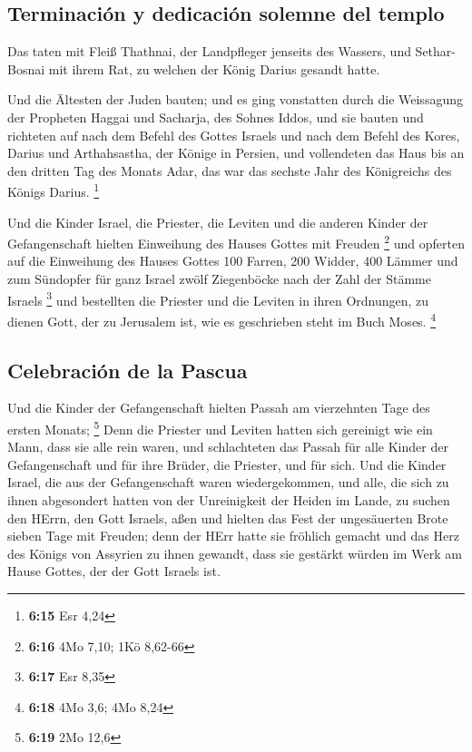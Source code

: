 \hypertarget{terminaciuxf3n-y-dedicaciuxf3n-solemne-del-templo}{%
\subsection{Terminación y dedicación solemne del
templo}\label{terminaciuxf3n-y-dedicaciuxf3n-solemne-del-templo}}

 Das taten mit Fleiß Thathnai, der Landpfleger jenseits
des Wassers, und Sethar-Bosnai mit ihrem Rat, zu welchen der König
Darius gesandt hatte.

 Und die Ältesten der Juden bauten; und es ging
vonstatten durch die Weissagung der Propheten Haggai und Sacharja, des
Sohnes Iddos, und sie bauten und richteten auf nach dem Befehl des
Gottes Israels und nach dem Befehl des Kores, Darius und Arthahsastha,
der Könige in Persien,  und vollendeten das Haus bis an
den dritten Tag des Monats Adar, das war das sechste Jahr des
Königreichs des Königs Darius. \footnote{\textbf{6:15} Esr 4,24}

 Und die Kinder Israel, die Priester, die Leviten und die
anderen Kinder der Gefangenschaft hielten Einweihung des Hauses Gottes
mit Freuden \footnote{\textbf{6:16} 4Mo 7,10; 1Kö 8,62-66}
 und opferten auf die Einweihung des Hauses Gottes 100
Farren, 200 Widder, 400 Lämmer und zum Sündopfer für ganz Israel zwölf
Ziegenböcke nach der Zahl der Stämme Israels \footnote{\textbf{6:17} Esr
  8,35}  und bestellten die Priester und die Leviten in
ihren Ordnungen, zu dienen Gott, der zu Jerusalem ist, wie es
geschrieben steht im Buch Moses. \footnote{\textbf{6:18} 4Mo 3,6; 4Mo
  8,24}

\hypertarget{celebraciuxf3n-de-la-pascua}{%
\subsection{Celebración de la
Pascua}\label{celebraciuxf3n-de-la-pascua}}

 Und die Kinder der Gefangenschaft hielten Passah am
vierzehnten Tage des ersten Monats; \footnote{\textbf{6:19} 2Mo 12,6}
 Denn die Priester und Leviten hatten sich gereinigt wie
ein Mann, dass sie alle rein waren, und schlachteten das Passah für alle
Kinder der Gefangenschaft und für ihre Brüder, die Priester, und für
sich.  Und die Kinder Israel, die aus der Gefangenschaft
waren wiedergekommen, und alle, die sich zu ihnen abgesondert hatten von
der Unreinigkeit der Heiden im Lande, zu suchen den HErrn, den Gott
Israels, aßen  und hielten das Fest der ungesäuerten
Brote sieben Tage mit Freuden; denn der HErr hatte sie fröhlich gemacht
und das Herz des Königs von Assyrien zu ihnen gewandt, dass sie gestärkt
würden im Werk am Hause Gottes, der der Gott Israels ist.

